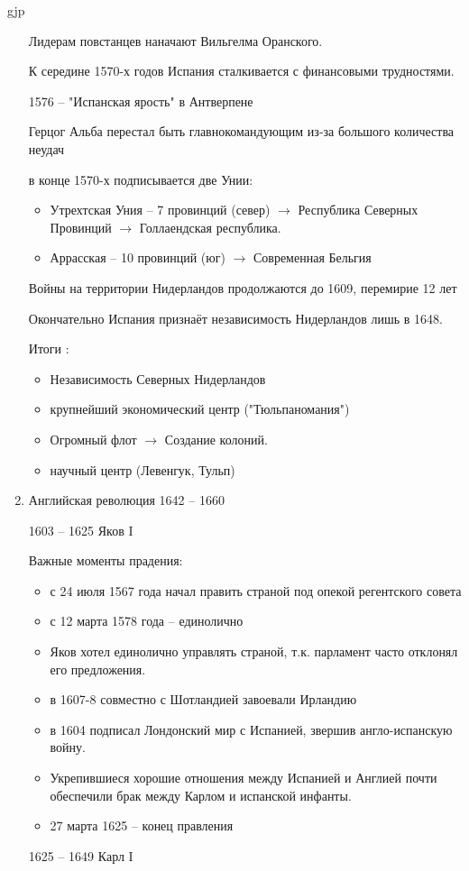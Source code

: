 gjp	 \documentclass[12pt,a4paper]{article}
\begin{document}
\begin{enumerate}
	Лидерам повстанцев наначают Вильгелма Оранского.
	
	К середине 1570-х годов Испания сталкивается с финансовыми трудностями.
	
	1576 -- "Испанская ярость" в Антверпене
	
	Герцог Альба перестал быть главнокомандующим из-за большого количества неудач
	
	в конце 1570-х подписывается две Унии:
	\begin{itemize}
		\item Утрехтская Уния -- 7 провинций (север) $\rightarrow$ Республика Северных Провинций $\rightarrow$ Голлаендская республика.
		\item Аррасская -- 10 провинций (юг) $\rightarrow$ Современная Бельгия
	\end{itemize}
	
	Войны на территории Нидерландов продолжаются до 1609, перемирие 12 лет
	
	Окончательно Испания признаёт независимость Нидерландов лишь в 1648.
	
	Итоги :
	\begin{itemize}
		\item Независимость Северных Нидерландов
		\item крупнейший экономический центр ("Тюльпаномания")
		\item Огромный флот $\rightarrow$ Создание колоний.
		\item научный центр (Левенгук, Тульп)
	\end{itemize}	 
	\item Английская революция 1642 -- 1660
	
	1603 -- 1625 Яков I
	
	Важные моменты прадения:
	\begin{itemize}
		\item с 24 июля 1567 года начал править страной под опекой регентского совета
		\item с 12 марта 1578 года -- единолично
		\item Яков хотел единолично управлять страной, т.к. парламент часто отклонял его предложения.
		\item в 1607-8 совместно с Шотландией завоевали Ирландию
		\item в 1604 подписал Лондонский мир с Испанией, звершив англо-испанскую войну.
		\item Укрепившиеся хорошие отношения между Испанией и Англией почти обеспечили брак между Карлом и испанской инфанты.
		\item 27 марта 1625 -- конец правления
	\end{itemize}
	1625 -- 1649 Карл I
	

\end{enumerate}
\end{document}
